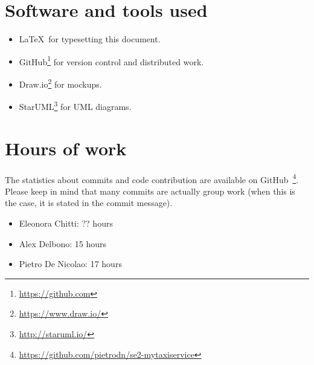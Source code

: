 \section{Software and tools used}
\begin{itemize}
    \item \LaTeX\, for typesetting this document.
    \item GitHub\footnote{\url{https://github.com}} for version control and distributed work.
    \item Draw.io\footnote{\url{https://www.draw.io/}} for mockups.
    \item StarUML\footnote{\url{http://staruml.io/}} for UML diagrams.
\end{itemize}

\section{Hours of work}
The statistics about commits and code contribution are available on GitHub~\footnote{\url{https://github.com/pietrodn/se2-mytaxiservice}}.
Please keep in mind that many commits are actually group work (when this is the case, it is stated in the commit message).

\begin{itemize}
    \item Eleonora Chitti: ?? hours
    \item Alex Delbono: 15 hours
    \item Pietro De Nicolao: 17 hours
\end{itemize}
